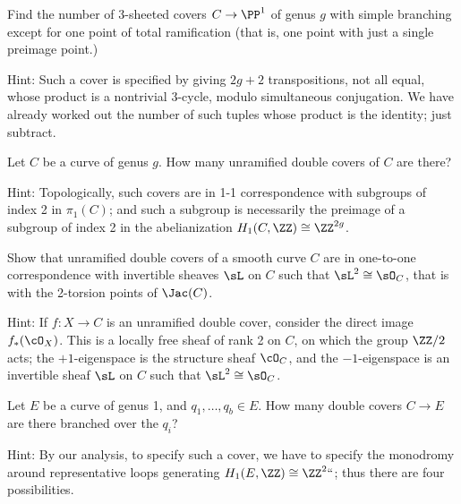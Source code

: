 \begin{exercise}
Find the number of 
3-sheeted covers
%
$C \to \PP^1$ of genus $g$ with
simple branching except for one point of 
%
%
total ramification
%
(that is,
one point with just a single preimage point.)

Hint: Such a cover is specified by giving $2g+2$ transpositions, not
all equal, whose product is a nontrivial 3-cycle, modulo simultaneous
conjugation. We have already worked out the number of such tuples whose
product is the identity; just subtract.
\end{exercise}

\begin{exercise}
Let $C$ be a curve of genus $g$. How many 
unramified double covers
of $C$
%
are there?

Hint: Topologically, such covers are in 1-1 correspondence with
subgroups of index 2 in $\pi_1(C)$; and such a subgroup is necessarily
the preimage of a subgroup of index 2 in the abelianization $H_1(C, \ZZ)
\cong \ZZ^{2g}$.
\end{exercise}

\begin{exercise}
Show that unramified 
double covers
%
of a smooth curve $C$ are in one-to-one
correspondence
with invertible sheaves $\sL$ on $C$ such that $\sL^2 \cong \sO_C$,
that is with the 
2-torsion points
%
of $\Jac(C)$.

Hint: If $f : X \to C$ is an unramified double cover, consider the direct
image $f_*(\cO_X)$. This is a locally free sheaf of rank 2 on $C$,
on which the group $\ZZ/2$ acts; the $+1$-eigenspace is the structure
sheaf $\cO_C$, and the $-1$-eigenspace is an invertible sheaf $\sL$
on $C$ such that $\sL^2 \cong \sO_C$.
\end{exercise}

\begin{exercise} Let $E$ be a curve of genus 1, and $q_1,\dots,q_b \in
E$. How many double covers $C \to E$ are there branched over the $q_i$?

Hint: By our analysis, to specify such a cover, we have to specify the
monodromy around representative loops generating $H_1(E, \ZZ) \cong
\ZZ^2` `$; thus there are four possibilities.
\end{exercise}

